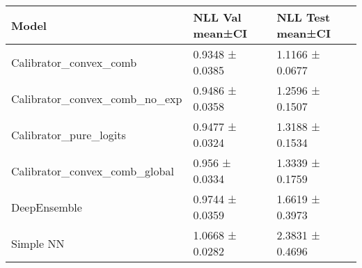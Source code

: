 \begin{tabular}{lll}
\toprule
Model & NLL Val mean±CI & NLL Test mean±CI \\
\midrule
Calibrator_convex_comb & 0.9348 ± 0.0385 & 1.1166 ± 0.0677 \\
Calibrator_convex_comb_no_exp & 0.9486 ± 0.0358 & 1.2596 ± 0.1507 \\
Calibrator_pure_logits & 0.9477 ± 0.0324 & 1.3188 ± 0.1534 \\
Calibrator_convex_comb_global & 0.956 ± 0.0334 & 1.3339 ± 0.1759 \\
DeepEnsemble & 0.9744 ± 0.0359 & 1.6619 ± 0.3973 \\
Simple NN & 1.0668 ± 0.0282 & 2.3831 ± 0.4696 \\
\bottomrule
\end{tabular}
